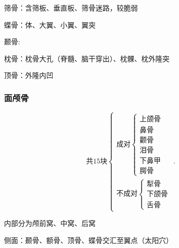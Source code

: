 \begin{notation}
    筛骨：含筛板、垂直板、筛骨迷路，较脆弱
\end{notation}

\begin{notation}
    蝶骨：体、大翼、小翼、翼突
\end{notation}

\begin{notation}
    颞骨:
\end{notation}

\begin{notation}
    枕骨：枕骨大孔（脊髓、脑干穿出）、枕髁、枕外隆突

    顶骨：外隆内凹
\end{notation}

\subsubsection{面颅骨}%
\label{subsub:面颅骨}
\[
    \mbox{共15块}
    \begin{cases}
        \mbox{成对}
        \begin{cases}
            \mbox{上颌骨}\\ 
            \mbox{鼻骨}\\ 
            \mbox{颧骨}\\ 
            \mbox{泪骨}\\ 
            \mbox{下鼻甲}\\ 
            \mbox{腭骨}
        \end{cases}\\
        \mbox{不成对}
        \begin{cases}
            \mbox{犁骨}\\ 
            \mbox{下颌骨}\\ 
            \mbox{舌骨}
        \end{cases}
    \end{cases}
.\] 

内部分为颅前窝、中窝、后窝

侧面：颞骨、额骨、顶骨、蝶骨交汇至翼点（太阳穴）





















